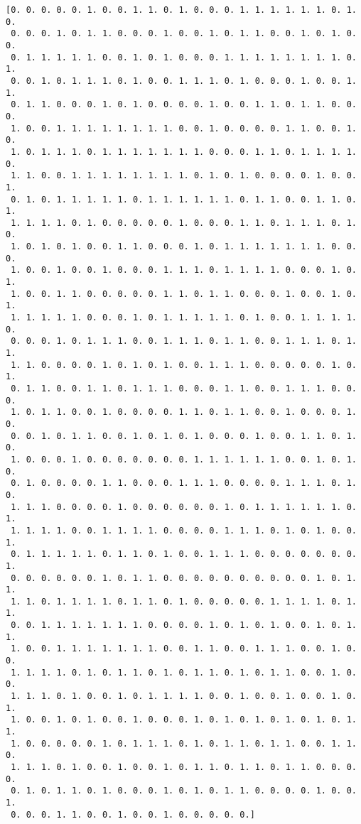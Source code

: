 \documentclass[11pt]{article}
\begin{document}
\begin{Verbatim}[commandchars=\\\{\}]
[0. 0. 0. 0. 0. 1. 0. 0. 1. 1. 0. 1. 0. 0. 0. 1. 1. 1. 1. 1. 1. 0. 1. 0.
 0. 0. 0. 1. 0. 1. 1. 0. 0. 0. 1. 0. 0. 1. 0. 1. 1. 0. 0. 1. 0. 1. 0. 0.
 0. 1. 1. 1. 1. 1. 0. 0. 1. 0. 1. 0. 0. 0. 1. 1. 1. 1. 1. 1. 1. 1. 0. 1.
 0. 0. 1. 0. 1. 1. 1. 0. 1. 0. 0. 1. 1. 1. 0. 1. 0. 0. 0. 1. 0. 0. 1. 1.
 0. 1. 1. 0. 0. 0. 1. 0. 1. 0. 0. 0. 0. 1. 0. 0. 1. 1. 0. 1. 1. 0. 0. 0.
 1. 0. 0. 1. 1. 1. 1. 1. 1. 1. 1. 0. 0. 1. 0. 0. 0. 0. 1. 1. 0. 0. 1. 0.
 1. 0. 1. 1. 1. 0. 1. 1. 1. 1. 1. 1. 1. 0. 0. 0. 1. 1. 0. 1. 1. 1. 1. 0.
 1. 1. 0. 0. 1. 1. 1. 1. 1. 1. 1. 1. 0. 1. 0. 1. 0. 0. 0. 0. 1. 0. 0. 1.
 0. 1. 0. 1. 1. 1. 1. 1. 0. 1. 1. 1. 1. 1. 1. 0. 1. 1. 0. 0. 1. 1. 0. 1.
 1. 1. 1. 1. 0. 1. 0. 0. 0. 0. 0. 1. 0. 0. 0. 1. 1. 0. 1. 1. 1. 0. 1. 0.
 1. 0. 1. 0. 1. 0. 0. 1. 1. 0. 0. 0. 1. 0. 1. 1. 1. 1. 1. 1. 1. 0. 0. 0.
 1. 0. 0. 1. 0. 0. 1. 0. 0. 0. 1. 1. 1. 0. 1. 1. 1. 1. 0. 0. 0. 1. 0. 1.
 1. 0. 0. 1. 1. 0. 0. 0. 0. 0. 1. 1. 0. 1. 1. 0. 0. 0. 1. 0. 0. 1. 0. 1.
 1. 1. 1. 1. 1. 0. 0. 0. 1. 0. 1. 1. 1. 1. 1. 0. 1. 0. 0. 1. 1. 1. 1. 0.
 0. 0. 0. 1. 0. 1. 1. 1. 0. 0. 1. 1. 1. 0. 1. 1. 0. 0. 1. 1. 1. 0. 1. 1.
 1. 1. 0. 0. 0. 0. 1. 0. 1. 0. 1. 0. 0. 1. 1. 1. 0. 0. 0. 0. 0. 1. 0. 1.
 0. 1. 1. 0. 0. 1. 1. 0. 1. 1. 1. 0. 0. 0. 1. 1. 0. 0. 1. 1. 1. 0. 0. 0.
 1. 0. 1. 1. 0. 0. 1. 0. 0. 0. 0. 1. 1. 0. 1. 1. 0. 0. 1. 0. 0. 0. 1. 0.
 0. 0. 1. 0. 1. 1. 0. 0. 1. 0. 1. 0. 1. 0. 0. 0. 1. 0. 0. 1. 1. 0. 1. 0.
 1. 0. 0. 0. 1. 0. 0. 0. 0. 0. 0. 0. 1. 1. 1. 1. 1. 1. 0. 0. 1. 0. 1. 0.
 0. 1. 0. 0. 0. 0. 1. 1. 0. 0. 0. 1. 1. 1. 0. 0. 0. 0. 1. 1. 1. 0. 1. 0.
 1. 1. 1. 0. 0. 0. 0. 1. 0. 0. 0. 0. 0. 0. 1. 0. 1. 1. 1. 1. 1. 1. 0. 1.
 1. 1. 1. 1. 0. 0. 1. 1. 1. 1. 0. 0. 0. 0. 1. 1. 1. 0. 1. 0. 1. 0. 0. 1.
 0. 1. 1. 1. 1. 1. 0. 1. 1. 0. 1. 0. 0. 1. 1. 1. 0. 0. 0. 0. 0. 0. 0. 1.
 0. 0. 0. 0. 0. 0. 1. 0. 1. 1. 0. 0. 0. 0. 0. 0. 0. 0. 0. 0. 1. 0. 1. 1.
 1. 1. 0. 1. 1. 1. 1. 0. 1. 1. 0. 1. 0. 0. 0. 0. 0. 1. 1. 1. 1. 0. 1. 1.
 0. 0. 1. 1. 1. 1. 1. 1. 1. 0. 0. 0. 0. 1. 0. 1. 0. 1. 0. 0. 1. 0. 1. 1.
 1. 0. 0. 1. 1. 1. 1. 1. 1. 1. 0. 0. 1. 1. 0. 0. 1. 1. 1. 0. 0. 1. 0. 0.
 1. 1. 1. 1. 0. 1. 0. 1. 1. 0. 1. 0. 1. 1. 0. 1. 0. 1. 1. 0. 0. 1. 0. 0.
 1. 1. 1. 0. 1. 0. 0. 1. 0. 1. 1. 1. 1. 0. 0. 1. 0. 0. 1. 0. 0. 1. 0. 1.
 1. 0. 0. 1. 0. 1. 0. 0. 1. 0. 0. 0. 1. 0. 1. 0. 1. 0. 1. 0. 1. 0. 1. 1.
 1. 0. 0. 0. 0. 0. 1. 0. 1. 1. 1. 0. 1. 0. 1. 1. 0. 1. 1. 0. 0. 1. 1. 0.
 1. 1. 1. 0. 1. 0. 0. 1. 0. 0. 1. 0. 1. 1. 0. 1. 1. 0. 1. 1. 0. 0. 0. 0.
 0. 1. 0. 1. 1. 0. 1. 0. 0. 0. 1. 0. 1. 0. 1. 1. 0. 0. 0. 0. 1. 0. 0. 1.
 0. 0. 0. 1. 1. 0. 0. 1. 0. 0. 1. 0. 0. 0. 0. 0.]





\end{Verbatim}
\end{document}
